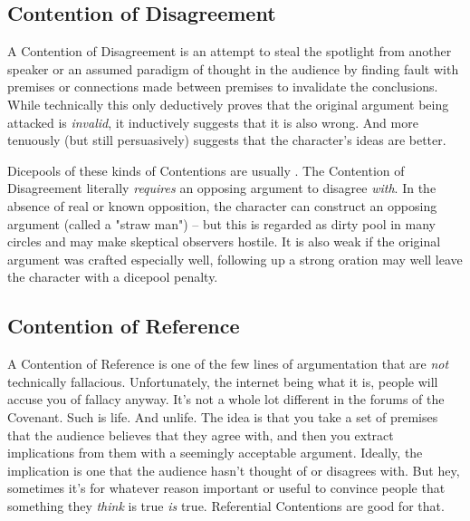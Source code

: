 \subsection{Contention of Disagreement}

A Contention of Disagreement is an attempt to steal the spotlight from another speaker or an assumed paradigm of thought in the audience by finding fault with premises or connections made between premises to invalidate the conclusions. While technically this only deductively proves that the original argument being attacked is \textit{invalid}, it inductively suggests that it is also wrong. And more tenuously (but still persuasively) suggests that the character's ideas are better.

Dicepools of these kinds of Contentions are usually . The Contention of Disagreement literally \textit{requires} an opposing argument to disagree \textit{with}. In the absence of real or known opposition, the character can construct an opposing argument (called a "straw man") -- but this is regarded as dirty pool in many circles and may make skeptical observers hostile. It is also weak if the original argument was crafted especially well, following up a strong oration may well leave the character with a dicepool penalty.

\subsection{Contention of Reference}

A Contention of Reference is one of the few lines of argumentation that are \textit{not} technically fallacious. Unfortunately, the internet being what it is, people will accuse you of fallacy anyway. It's not a whole lot different in the forums of the Covenant. Such is life. And unlife. The idea is that you take a set of premises that the audience believes that they agree with, and then you extract implications from them with a seemingly acceptable argument. Ideally, the implication is one that the audience hasn't thought of or disagrees with. But hey, sometimes it's for whatever reason important or useful to convince people that something they \textit{think} is true \textit{is} true. Referential Contentions are good for that.

